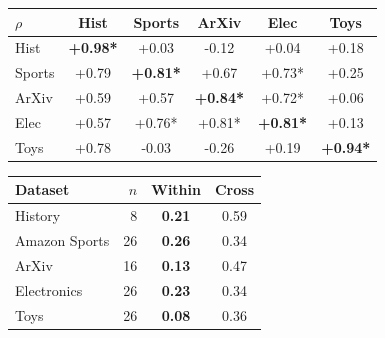 \begin{table}[htbp]
\begin{tabular}[t]{lccccc}
\toprule
$\rho$ & Hist & Sports & ArXiv & Elec & Toys \\
\midrule
Hist  & \textbf{+0.98*} & +0.03\phantom{*} & -0.12\phantom{*} & +0.04\phantom{*} & +0.18\phantom{*} \\
Sports& +0.79\phantom{*} & \textbf{+0.81*} & +0.67\phantom{*} & +0.73* & +0.25\phantom{*} \\
ArXiv & +0.59\phantom{*} & +0.57\phantom{*} & \textbf{+0.84*} & +0.72* & +0.06\phantom{*} \\
Elec  & +0.57\phantom{*} & +0.76* & +0.81* & \textbf{+0.81*} & +0.13\phantom{*} \\
Toys  & +0.78\phantom{*} & -0.03\phantom{*} & -0.26\phantom{*} & +0.19\phantom{*} & \textbf{+0.94*} \\
\bottomrule
\end{tabular}%
\hspace{2em}
\begin{tabular}[t]{lrcc}
\toprule
Dataset & $n$ & Within & Cross \\
\midrule
History       & 8  & \textbf{0.21} & 0.59 \\
Amazon Sports & 26 & \textbf{0.26} & 0.34 \\
ArXiv         & 16 & \textbf{0.13} & 0.47 \\
Electronics   & 26 & \textbf{0.23} & 0.34 \\
Toys          & 26 & \textbf{0.08} & 0.36 \\
\bottomrule
\end{tabular}

\end{table}
